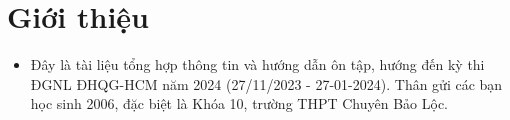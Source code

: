 \section{Giới thiệu}
\begin{itemize}
    \item Đây là tài liệu tổng hợp thông tin và hướng dẫn ôn tập, hướng đến kỳ thi ĐGNL ĐHQG-HCM năm 2024 (27/11/2023 - 27-01-2024). Thân gửi các bạn học sinh 2006, đặc biệt là Khóa 10, trường THPT Chuyên Bảo Lộc.
\end{itemize}